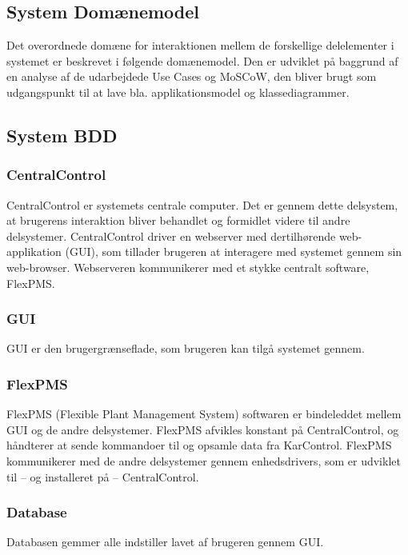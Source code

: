 
\subsection{System Domænemodel}

Det overordnede domæne for interaktionen mellem de forskellige delelementer i systemet er beskrevet
i følgende domænemodel. Den er udviklet på baggrund af en analyse af de udarbejdede Use Cases og MoSCoW, den bliver brugt som udgangspunkt til at lave bla. applikationsmodel og klassediagrammer. 

\subsection{System BDD}

\subsubsection{CentralControl}
CentralControl er systemets centrale computer. Det er gennem dette delsystem, at brugerens interaktion bliver behandlet og formidlet videre til andre delsystemer. CentralControl driver en webserver med dertilhørende web-applikation (GUI), som tillader brugeren at interagere med systemet gennem sin web-browser. Webserveren kommunikerer med et stykke centralt software, FlexPMS.

\subsubsection{GUI}
GUI er den brugergrænseflade, som brugeren kan tilgå systemet gennem.

\subsubsection{FlexPMS}
FlexPMS (Flexible Plant Management System) softwaren er bindeleddet mellem GUI og de andre delsystemer. FlexPMS afvikles konstant på CentralControl, og håndterer at sende kommandoer til og opsamle data fra KarControl. FlexPMS kommunikerer med de andre delsystemer gennem enhedsdrivers, som er udviklet til – og installeret på – CentralControl.

\subsubsection{Database}
Databasen gemmer alle indstiller lavet af brugeren gennem GUI.

